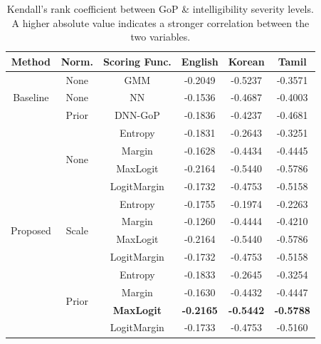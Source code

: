 \begin{table}[t]
\caption{
Kendall's rank coefficient between GoP \& intelligibility severity levels. A higher absolute value indicates a stronger correlation between the two variables.
}
\vspace{1em}
\label{tab:results}
\centering
\resizebox{0.48\textwidth}{!}
{

\begin{tabular}{c|c|c|c|c|c}
\hline
Method & Norm. & Scoring Func. & English & Korean & Tamil \\
\hline
\multirow{3}{*}{Baseline} 
& None & GMM \cite{witt2000phone,hmm-gop} & -0.2049 & -0.5237 & -0.3571 \\
& None & NN \cite{hu2015improved} & -0.1536 & -0.4687 & -0.4003 \\
& Prior & DNN-GoP \cite{hu2015improved} & -0.1836 & -0.4237 & -0.4681 \\
\hline
\multirow{12}{*}{Proposed} 
& \multirow{4}{*}{None}  & Entropy & -0.1831 & -0.2643 & -0.3251  \\
&  & Margin & -0.1628 & -0.4434 & -0.4445 \\
&  & MaxLogit & -0.2164 & -0.5440 & -0.5786 \\
&  & LogitMargin & -0.1732 & -0.4753 & -0.5158 \\
\cline{2-6}
& \multirow{4}{*}{Scale} & Entropy & -0.1755 & -0.1974 & -0.2263 \\
&  & Margin & -0.1260 & -0.4444 & -0.4210\\
&  & MaxLogit & -0.2164 & -0.5440 & -0.5786 \\
&  & LogitMargin & -0.1732 & -0.4753 & -0.5158\\
\cline{2-6}
& \multirow{4}{*}{Prior} & Entropy & -0.1833 & -0.2645 & -0.3254  \\
&  & Margin & -0.1630 & -0.4432 & -0.4447\\
&  & \textbf{MaxLogit} & \textbf{-0.2165} & \textbf{-0.5442} & \textbf{-0.5788}\\
&  & LogitMargin & -0.1733 & -0.4753 & -0.5160\\
\hline
\end{tabular}
}
\vspace{-1em}
\end{table}

%